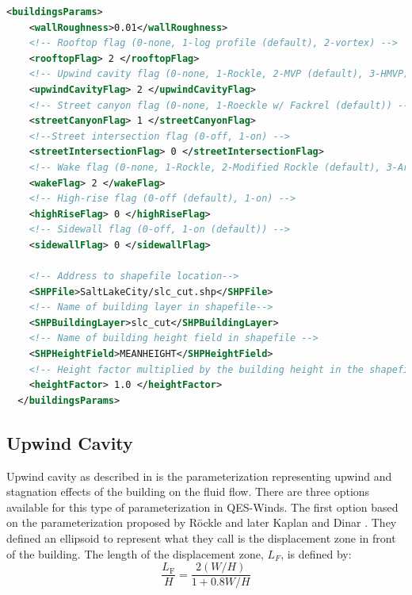 \begin{lstlisting}[language=XML]
<buildingsParams>
    <wallRoughness>0.01</wallRoughness>  
    <!-- Rooftop flag (0-none, 1-log profile (default), 2-vortex) -->
    <rooftopFlag> 2 </rooftopFlag> 
    <!-- Upwind cavity flag (0-none, 1-Rockle, 2-MVP (default), 3-HMVP) -->
    <upwindCavityFlag> 2 </upwindCavityFlag> 	
    <!-- Street canyon flag (0-none, 1-Roeckle w/ Fackrel (default)) -->		
    <streetCanyonFlag> 1 </streetCanyonFlag> 	
    <!--Street intersection flag (0-off, 1-on) -->		
    <streetIntersectionFlag> 0 </streetIntersectionFlag> 
    <!-- Wake flag (0-none, 1-Rockle, 2-Modified Rockle (default), 3-Area Scaled) -->		
    <wakeFlag> 2 </wakeFlag> 					
	<!-- High-rise flag (0-off (default), 1-on) -->
    <highRiseFlag> 0 </highRiseFlag> 
    <!-- Sidewall flag (0-off, 1-on (default)) -->           
    <sidewallFlag> 0 </sidewallFlag> 				
    
    <!-- Address to shapefile location-->
    <SHPFile>SaltLakeCity/slc_cut.shp</SHPFile>	 
    <!-- Name of building layer in shapefile-->                       
    <SHPBuildingLayer>slc_cut</SHPBuildingLayer>     
    <!-- Name of building height field in shapefile -->                     
    <SHPHeightField>MEANHEIGHT</SHPHeightField>      
    <!-- Height factor multiplied by the building height in the shapefile (default = 1.0)-->                    
    <heightFactor> 1.0 </heightFactor>				        
  </buildingsParams>
\end{lstlisting}

\subsection{Upwind Cavity}\label{upwind-cavity}

Upwind cavity as described in \cite{nelson20085,bagal2004improved,gowardhan2010evaluation} is the parameterization representing upwind and stagnation effects of the building on the fluid flow. There are three options available for this type of parameterization in QES-Winds. The first option based on the parameterization proposed by R\"{o}ckle \cite{rockle1990bestimmung} and later Kaplan and Dinar \cite{kaplan1996lagrangian}. They defined an ellipsoid to represent what they call is the displacement zone in front of the building. The length of the displacement zone, $L_F$, is defined by: 
\begin{equation}
\frac{L_{\mathrm{F}}}{H}=\frac{2(W / H)}{1+0.8 W / H}
\label{eq:lf}
\end{equation}

